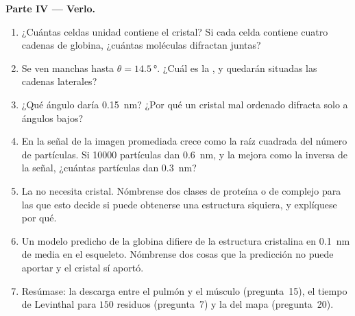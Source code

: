 \begin{problem}
\medskip
\noindent\textbf{Parte IV --- Verlo.}
\begin{enumerate}[resume]
  \item ¿Cuántas celdas unidad contiene el cristal? Si cada celda
        contiene cuatro cadenas de globina, ¿cuántas moléculas difractan
        juntas?
  \item Se ven manchas hasta $\theta = \qty{14.5}{\degree}$. ¿Cuál es la
        , y quedarán situadas las cadenas laterales?
  \item ¿Qué ángulo daría \qty{0.15}{nm}? ¿Por qué un cristal mal
        ordenado difracta solo a ángulos bajos?
  \item En  la señal de la imagen promediada
        crece como la raíz cuadrada del número de partículas. Si
        \num{10000} partículas dan \qty{0.6}{nm}, y la  mejora
        como la inversa de la señal, ¿cuántas partículas dan
        \qty{0.3}{nm}?
  \item La  no necesita cristal. Nómbrense
        dos clases de proteína o de complejo para las que esto decide si
        puede obtenerse una estructura siquiera, y explíquese por qué.
  \item Un modelo predicho de la globina difiere de la estructura
        cristalina en \qty{0.1}{nm} de media en el esqueleto. Nómbrense
        dos cosas que la predicción no puede aportar y el cristal sí
        aportó.
  \item Resúmase: la descarga entre el pulmón y el músculo
        (pregunta~15), el tiempo de Levinthal para $150$ residuos
        (pregunta~7) y la  del mapa (pregunta~20).
\end{enumerate}
\end{problem}
